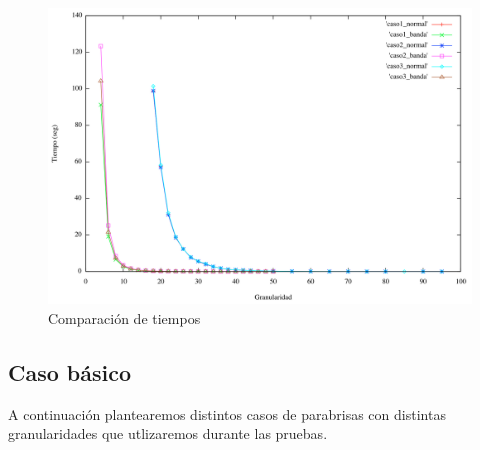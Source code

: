 \begin{figure}[htb]
\begin{center}
        \includegraphics[scale=0.5]{imagenes/comparacion_tiempos.png}
                \caption{Comparación de tiempos}
        \end{center}

\end{figure}
\subsection{Caso básico}
\newpage
A continuación plantearemos distintos casos de parabrisas con distintas granularidades que utlizaremos durante las pruebas. 


